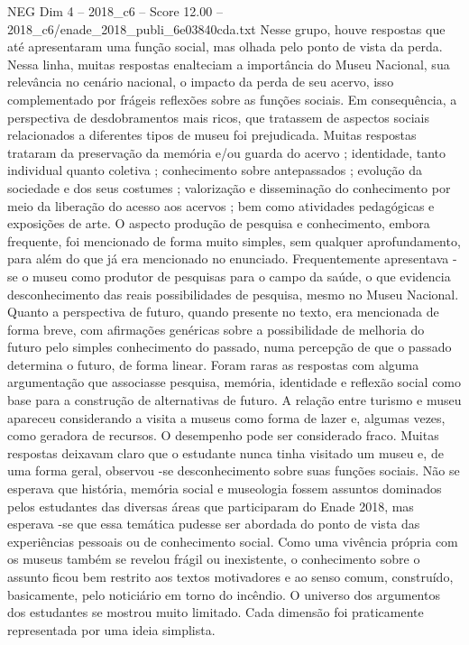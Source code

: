 \begin{textsample}{NEG Dim 4 – 2018\_c6 – Score 12.00 – 2018\_c6/enade\_2018\_publi\_6e03840cda.txt}
Nesse grupo, houve respostas que até apresentaram uma função social, mas olhada pelo ponto de vista da perda.
Nessa linha, muitas respostas enalteciam a importância do Museu Nacional, sua relevância no cenário nacional, o impacto da perda de seu acervo, isso complementado por frágeis reflexões sobre as funções sociais.
Em consequência, a perspectiva de desdobramentos mais ricos, que tratassem de aspectos sociais relacionados a diferentes tipos de museu foi prejudicada.
Muitas respostas trataram da preservação da memória e/ou guarda do acervo ; identidade, tanto individual quanto coletiva ; conhecimento sobre antepassados ; evolução da sociedade e dos seus costumes ; valorização e disseminação do conhecimento por meio da liberação do acesso aos acervos ; bem como atividades pedagógicas e exposições de arte.
O aspecto produção de pesquisa e conhecimento, embora frequente, foi mencionado de forma muito simples, sem qualquer aprofundamento, para além do que já era mencionado no enunciado.
Frequentemente apresentava -se o museu como produtor de pesquisas para o campo da saúde, o que evidencia desconhecimento das reais possibilidades de pesquisa, mesmo no Museu Nacional.
Quanto a perspectiva de futuro, quando presente no texto, era mencionada de forma breve, com afirmações genéricas sobre a possibilidade de melhoria do futuro pelo simples conhecimento do passado, numa percepção de que o passado determina o futuro, de forma linear.
Foram raras as respostas com alguma argumentação que associasse pesquisa, memória, identidade e reflexão social como base para a construção de alternativas de futuro.
A relação entre turismo e museu apareceu considerando a visita a museus como forma de lazer e, algumas vezes, como geradora de recursos.
O desempenho pode ser considerado fraco.
Muitas respostas deixavam claro que o estudante nunca tinha visitado um museu e, de uma forma geral, observou -se desconhecimento sobre suas funções sociais.
Não se esperava que história, memória social e museologia fossem assuntos dominados pelos estudantes das diversas áreas que participaram do Enade 2018, mas esperava -se que essa temática pudesse ser abordada do ponto de vista das experiências pessoais ou de conhecimento social.
Como uma vivência própria com os museus também se revelou frágil ou inexistente, o conhecimento sobre o assunto ficou bem restrito aos textos motivadores e ao senso comum, construído, basicamente, pelo noticiário em torno do incêndio.
O universo dos argumentos dos estudantes se mostrou muito limitado.
Cada dimensão foi praticamente representada por uma ideia simplista.

\end{textsample}
